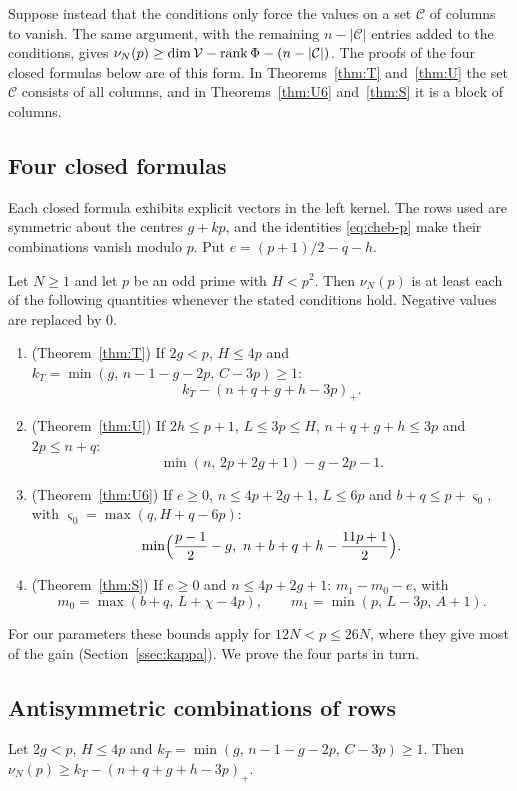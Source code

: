 Suppose instead that the conditions only force the values on a set $\mathcal C$ of columns to vanish. The
same argument, with the remaining $n-|\mathcal C|$ entries added to the conditions, gives
$\nu_N(p)\ge\dim\mathcal V-\operatorname{rank}\Phi-(n-|\mathcal C|)$. The proofs of the four closed formulas below
are of this form. In Theorems~\ref{thm:T} and~\ref{thm:U} the set $\mathcal C$ consists of all columns, and in
Theorems~\ref{thm:U6} and~\ref{thm:S} it is a block of columns.

\subsection{Four closed formulas}
Each closed formula exhibits explicit vectors in the left kernel. The rows used are symmetric about the
centres $g+kp$, and the identities \eqref{eq:cheb-p} make their combinations vanish modulo $p$. Put
$e=(p+1)/2-q-h$.

\begin{theorem}\label{thm:content}
Let $N\ge1$ and let $p$ be an odd prime with $H<p^2$. Then $\nu_N(p)$ is at least each of the following
quantities whenever the stated conditions hold. Negative values are replaced by $0$.
\begin{enumerate}[label=(\alph*)]
\item (Theorem~\ref{thm:T}) If $2g<p$, $H\le4p$ and $k_T=\min(g,\,n-1-g-2p,\,C-3p)\ge1$:
\[
 k_T-(n+q+g+h-3p)_+ .
\]
\item (Theorem~\ref{thm:U}) If $2h\le p+1$, $L\le3p\le H$, $n+q+g+h\le3p$ and $2p\le n+q$:
\[
 \min(n,\,2p+2g+1)-g-2p-1 .
\]
\item (Theorem~\ref{thm:U6}) If $e\ge0$, $n\le4p+2g+1$, $L\le6p$ and $b+q\le p+\varsigma_0$, with
$\varsigma_0=\max(q,H+q-6p)$:
\[
 \min\Bigl(\frac{p-1}2-g,\ n+b+q+h-\frac{11p+1}2\Bigr).
\]
\item (Theorem~\ref{thm:S}) If $e\ge0$ and $n\le4p+2g+1$: $m_1-m_0-e$, with
\[
 m_0=\max(b+q,\,L+\chi-4p),\qquad m_1=\min(p,\,L-3p,\,A+1).
\]
\end{enumerate}
\end{theorem}

For our parameters these bounds apply for $12N<p\le26N$, where they give most of the gain
(Section~\ref{ssec:kappa}). We prove the four parts in turn.

\subsection{Antisymmetric combinations of rows}
\begin{theorem}\label{thm:T}
Let $2g<p$, $H\le4p$ and $k_T=\min(g,\,n-1-g-2p,\,C-3p)\ge1$. Then
$\nu_N(p)\ge k_T-(n+q+g+h-3p)_+$.
\end{theorem}

